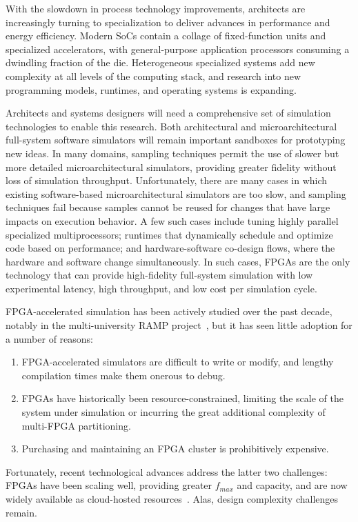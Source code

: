 With the slowdown in process technology improvements, architects are
increasingly turning to specialization to deliver advances in
performance and energy efficiency.  Modern SoCs contain a collage of
fixed-function units and specialized accelerators, with
general-purpose application processors consuming a dwindling fraction
of the die.  Heterogeneous specialized systems add new complexity at
all levels of the computing stack, and research into new programming
models, runtimes, and operating systems is expanding.

Architects and systems designers will need a comprehensive set of
simulation technologies to enable this research. Both architectural
and microarchitectural full-system software
simulators will remain important sandboxes for
prototyping new ideas. In many domains, sampling techniques permit the use of
slower but more detailed microarchitectural simulators, providing
greater fidelity without loss of simulation throughput.
Unfortunately, there are many cases in which existing software-based
microarchitectural simulators are too slow, and sampling techniques
fail because samples cannot be reused for changes that have large
impacts on execution behavior.  A few such cases include tuning highly
parallel specialized multiprocessors; runtimes that dynamically
schedule and optimize code based on performance; and hardware-software
co-design flows, where the hardware and software change
simultaneously. In such cases, FPGAs are the only technology that can
provide high-fidelity full-system simulation with low experimental
latency, high throughput, and low cost per simulation
cycle.

FPGA-accelerated simulation has been actively studied over the past
decade, notably in the multi-university RAMP project~\cite{RAMP}, but it has seen little adoption for a number of
reasons:
\begin{enumerate}
\item FPGA-accelerated simulators are difficult to write or modify, and
lengthy compilation times make them onerous to debug.
\item FPGAs have historically been resource-constrained,
limiting the scale of the system under simulation
or incurring the great additional complexity of multi-FPGA partitioning.
\item Purchasing and maintaining an FPGA cluster is prohibitively
expensive.
\end{enumerate}
Fortunately, recent technological advances address the latter two
challenges: FPGAs have been scaling well, providing greater $f_{max}$ and capacity, and
are now widely available as cloud-hosted
resources~\cite{amazonf1}.  Alas, design complexity
challenges remain.

